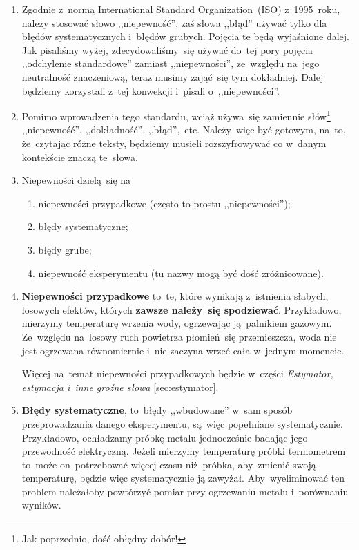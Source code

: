\documentclass[a4paper,11pt]{article}
\newcommand{\tb}{\textbf}
\begin{document}
\begin{enumerate}
\item Zgodnie z~normą International Standard Organization~(ISO)
  z~1995~roku, należy stosować słowo ,,niepewność'', zaś słowa
  ,,błąd'' używać tylko dla błędów systematycznych i~błędów grubych.
  Pojęcia te będą wyjaśnione dalej. Jak pisaliśmy wyżej,
  zdecydowaliśmy~się używać do~tej pory pojęcia ,,odchylenie
  standardowe'' zamiast ,,niepewności'', ze~względu na~jego
  neutralność znaczeniową, teraz musimy zająć~się tym dokładniej.
  Dalej będziemy korzystali z~tej konwekcji i~pisali
  o~,,niepewności''.

\item Pomimo wprowadzenia tego standardu, wciąż używa~się zamiennie
  słów\footnote{Jak poprzednio, dość obłędny dobór!} ,,niepewność'',
  ,,dokładność'', ,,błąd'',~etc. Należy~więc być gotowym, na~to,
  że~czytając różne teksty, będziemy musieli rozszyfrowywać co w~danym
  kontekście znaczą te~słowa.

\item Niepewności dzielą~się na
  \begin{enumerate}
  \item niepewności przypadkowe (często to prostu ,,niepewności'');
  \item błędy systematyczne;
  \item błędy grube;
  \item niepewność eksperymentu (tu nazwy mogą być dość zróżnicowane).
  \end{enumerate}

\item \textbf{Niepewności przypadkowe} to~te, które wynikają
  z~istnienia słabych, losowych efektów, których \tb{zawsze należy~się
    spodziewać}. Przykładowo, mierzymy temperaturę wrzenia wody,
  ogrzewając ją~palnikiem gazowym. Ze~względu na~losowy ruch powietrza
  płomień~się przemieszcza, woda nie jest ogrzewana równomiernie i~nie
  zaczyna wrzeć cała w~jednym momencie.

  Więcej na~temat niepewności przypadkowych będzie w~części
  \emph{Estymator, estymacja i~inne groźne słowa}
  \eqref{sec:estymator}.

\item \textbf{Błędy systematyczne}, to~błędy ,,wbudowane'' w~sam
  sposób przeprowadzania danego eksperymentu, są~więc popełniane
  systematycznie. Przykładowo, ochładzamy próbkę metalu jednocześnie
  badając jego przewodność elektryczną. Jeżeli mierzymy temperaturę
  próbki termometrem to~może on~potrzebować więcej czasu niż~próbka,
  aby~zmienić swoją temperaturę, będzie więc systematycznie ją
  zawyżał. Aby~wyeliminować ten problem należałoby powtórzyć pomiar
  przy ogrzewaniu metalu i~porównaniu wyników.


\end{enumerate}
\end{document}
